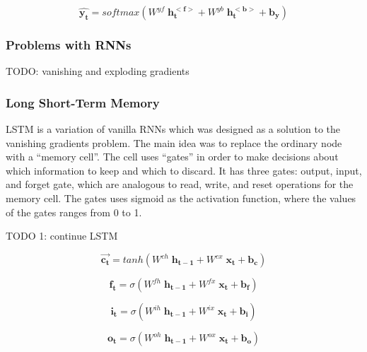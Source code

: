\begin{equation}
\label{eq:6}
\mathbf{\widehat{y_t}} = softmax(W^{yf} \; \mathbf{h_t^{<f>}} + W^{yb} \; \mathbf{h_t^{<b>}} + \mathbf{b_y})
\end{equation}



\subsubsection{Problems with \ac{RNN}s}
\label{bg:subsub4}
TODO: vanishing and exploding gradients \cite{hochreiter1991untersuchungen} \cite{hochreiter2001gradient} \cite{bengio1994learning}


\subsubsection{Long Short-Term Memory}
\label{bg:subsub5}
\ac{LSTM} \cite{hochreiter1997long} is a variation of vanilla \ac{RNN}s which was designed as a solution to the vanishing gradients problem. The main idea was to replace the ordinary node with a \enquote{memory cell}. The cell uses \enquote{gates} in order to make decisions about which information to keep and which to discard. It has three gates: output, input, and forget gate, which are analogous to read, write, and reset operations for the memory cell. The gates uses sigmoid as the activation function, where the values of the gates ranges from 0 to 1.


TODO 1: continue LSTM


\begin{equation}
\label{eq:10}
\mathbf{\vec{c_t}} = tanh(W^{ch} \; \mathbf{h_{t-1}} + W^{cx}\; \mathbf{x_t} + \mathbf{b_c})
\end{equation}

\begin{equation}
\label{eq:7}
\mathbf{f_t} = \sigma(W^{fh}\;\mathbf{h_{t-1}}  + W^{fx} \; \mathbf{x_t}  + \mathbf{b_f})
\end{equation}

\begin{equation}
\label{eq:8}
\mathbf{i_t } = \sigma(W^{ih} \; \mathbf{h_{t-1}} + W^{ix}\; \mathbf{x_t}  + \mathbf{b_i})
\end{equation}

\begin{equation}
\label{eq:9}
\mathbf{o_t} = \sigma(W^{oh} \; \mathbf{h_{t-1}} + W^{ox}\; \mathbf{x_t} + \mathbf{b_o})
\end{equation}


